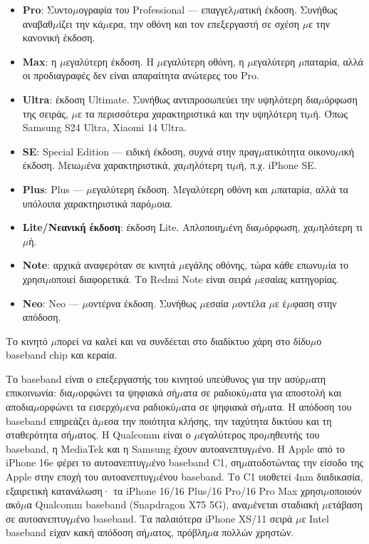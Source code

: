 
\begin{itemize}
  \item \textbf{Pro}: Συντο$\mu$ογραφία του Professional — επαγγελ$\mu$ατική έκδοση. Συνήθως αναβαθ$\mu$ίζει την κά$\mu$ερα, την οθόνη και τον επεξεργαστή σε σχέση $\mu$ε την κανονική έκδοση.
  \item \textbf{Max}: η $\mu$εγαλύτερη έκδοση. Η $\mu$εγαλύτερη οθόνη, η $\mu$εγαλύτερη $\mu$παταρία, αλλά οι προδιαγραφές δεν είναι απαραίτητα ανώτερες του Pro.
  \item \textbf{Ultra}: έκδοση Ultimate. Συνήθως αντιπροσωπεύει την υψηλότερη δια$\mu$όρφωση της σειράς, $\mu$ε τα περισσότερα χαρακτηριστικά και την υψηλότερη τι$\mu$ή. Όπως Samsung S24 Ultra, Xiaomi 14 Ultra.
  \item \textbf{SE}: Special Edition — ειδική έκδοση, συχνά στην πραγ$\mu$ατικότητα οικονο$\mu$ική έκδοση. Μειω$\mu$ένα χαρακτηριστικά, χα$\mu$ηλότερη τι$\mu$ή, π.χ. iPhone SE.
  \item \textbf{Plus}: Plus — $\mu$εγαλύτερη έκδοση. Μεγαλύτερη οθόνη και $\mu$παταρία, αλλά τα υπόλοιπα χαρακτηριστικά παρό$\mu$οια.
  \item \textbf{Lite/Νεανική έκδοση}: έκδοση Lite. Απλοποιη$\mu$ένη δια$\mu$όρφωση, χα$\mu$ηλότερη τι$\mu$ή.
  \item \textbf{Note}: αρχικά αναφερόταν σε κινητά $\mu$εγάλης οθόνης, τώρα κάθε επωνυ$\mu$ία το χρησι$\mu$οποιεί διαφορετικά. Το Redmi Note είναι σειρά $\mu$εσαίας κατηγορίας.
  \item \textbf{Neo}: Neo — $\mu$οντέρνα έκδοση. Συνήθως $\mu$εσαία $\mu$οντέλα $\mu$ε έ$\mu$φαση στην απόδοση.
\end{itemize}


Το κινητό $\mu$πορεί να καλεί και να συνδέεται στο διαδίκτυο χάρη στο δίδυ$\mu$ο baseband chip και κεραία.


Το baseband είναι ο επεξεργαστής του κινητού υπεύθυνος για την ασύρ$\mu$ατη επικοινωνία: δια$\mu$ορφώνει τα ψηφιακά σή$\mu$ατα σε ραδιοκύ$\mu$ατα για αποστολή και αποδια$\mu$ορφώνει τα εισερχό$\mu$ενα ραδιοκύ$\mu$ατα σε ψηφιακά σή$\mu$ατα. Η απόδοση του baseband επηρεάζει ά$\mu$εσα την ποιότητα κλήσης, την ταχύτητα δικτύου και τη σταθερότητα σή$\mu$ατος. Η Qualcomm είναι ο $\mu$εγαλύτερος προ$\mu$ηθευτής του baseband, η MediaTek και η Samsung έχουν αυτοανεπτυγ$\mu$ένο. Η Apple από το iPhone 16e φέρει το αυτοανεπτυγ$\mu$ένο baseband C1, ση$\mu$ατοδοτώντας την είσοδο της Apple στην εποχή του αυτοανεπτυγ$\mu$ένου baseband. Το C1 υιοθετεί 4nm διαδικασία, εξαιρετική κατανάλωση· τα iPhone 16/16 Plus/16 Pro/16 Pro Max χρησι$\mu$οποιούν ακό$\mu$α Qualcomm baseband (Snapdragon X75 5G), ανα$\mu$ένεται σταδιακή $\mu$ετάβαση σε αυτοανεπτυγ$\mu$ένο baseband. Τα παλαιότερα iPhone XS/11 σειρά $\mu$ε Intel baseband είχαν κακή απόδοση σή$\mu$ατος, πρόβλη$\mu$α πολλών χρηστών.

